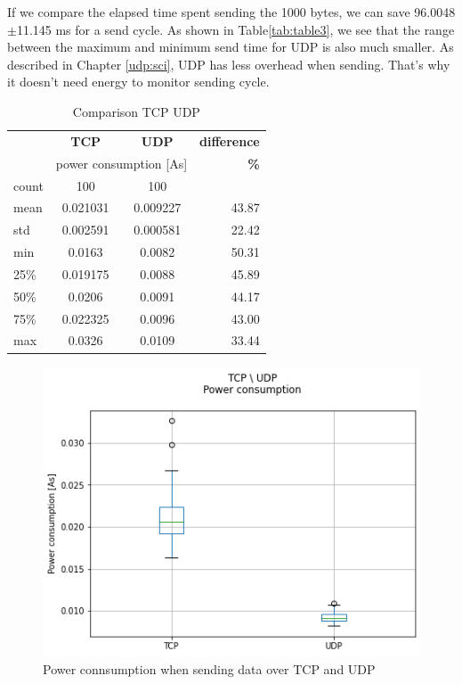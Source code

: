 If we compare the elapsed time spent sending the 1000 bytes,
we can save 96.0048$\pm$11.145 ms for a send cycle.
As shown in Table\ref{tab:table3},
we see that the range between the maximum and minimum send time for UDP is also much smaller.
As described in Chapter \ref{udp:sci}, UDP has less overhead when sending.
That's why it doesn't need energy to monitor sending cycle.
\begin{table}[H]
    \begin{center}
    \caption{Comparison TCP UDP}
    \label{tab:table4}
    \renewcommand{\arraystretch}{1.8}
    \begin{tabular}{l|c|c|r}
    & \textbf{TCP} & \textbf{{UDP}} & \textbf{difference} \\
    & \multicolumn{2}{c|}{ power consumption [As]} & \textbf{\%}\\
    \hline
    count & 100 & 100 & \\
    mean   & 0.021031 & 0.009227 & 43.87 \\
    std    & 0.002591 & 0.000581 & 22.42 \\
    min    & 0.0163 & 0.0082 & 50.31 \\
    25\%   & 0.019175 & 0.0088 & 45.89 \\
    50\%   & 0.0206 & 0.0091 & 44.17 \\
    75\%   & 0.022325 & 0.0096 & 43.00 \\
    max    & 0.0326 & 0.0109 & 33.44 \\
    \end{tabular}
    \end{center}
\end{table}
\begin{figure}[H]
    \centering
    \includegraphics[width = 0.9 \linewidth]{fig/udp_tcp/udp_tcp_boxplot_As.png}
    \caption{Power connsumption when sending data over TCP and UDP}
    \label{fig:udp_tcp_boxplot_As}
    \end{figure}
